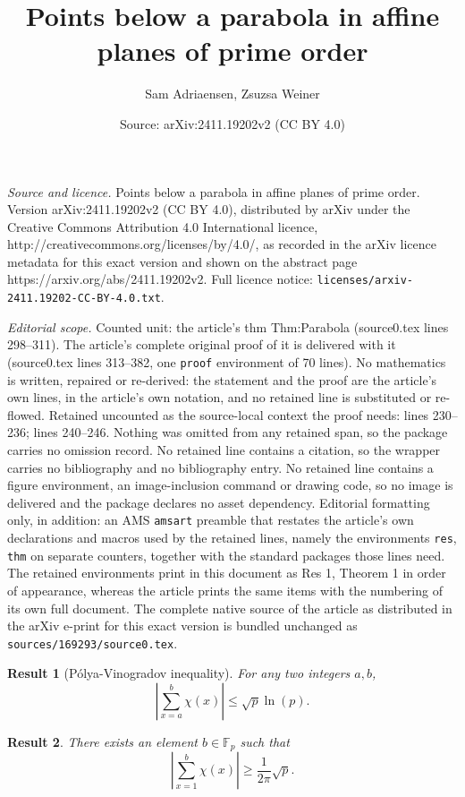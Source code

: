 \documentclass[10pt,a4paper]{amsart}
\title{Points below a parabola in affine planes of prime order}
\author{Sam Adriaensen, Zsuzsa Weiner}
\date{Source: arXiv:2411.19202v2 (CC BY 4.0)}
\newtheorem{res}{Result}
\newcommand{\FF}{\mathbb F}
\begin{document}
\maketitle

\noindent\emph{Source and licence.} Points below a parabola in affine planes of prime order. Version arXiv:2411.19202v2 (CC BY 4.0), distributed by arXiv under the Creative Commons Attribution 4.0 International licence, http://creativecommons.org/licenses/by/4.0/, as recorded in the arXiv licence metadata for this exact version and shown on the abstract page https://arxiv.org/abs/2411.19202v2. Full licence notice: \texttt{licenses/arxiv-2411.19202-CC-BY-4.0.txt}.\par\smallskip

\noindent\textit{Editorial scope.} Counted unit: the article's thm Thm:Parabola (source0.tex lines 298--311). The article's complete original proof of it is delivered with it (source0.tex lines 313--382, one \texttt{proof} environment of 70 lines). No mathematics is written, repaired or re-derived: the statement and the proof are the article's own lines, in the article's own notation, and no retained line is substituted or re-flowed.  Retained uncounted as the source-local context the proof needs: lines 230--236; lines 240--246.  Nothing was omitted from any retained span, so the package carries no omission record.  No retained line contains a citation, so the wrapper carries no bibliography and no bibliography entry.  No retained line contains a figure environment, an image-inclusion command or drawing code, so no image is delivered and the package declares no asset dependency.  Editorial formatting only, in addition: an AMS \texttt{amsart} preamble that restates the article's own declarations and macros used by the retained lines, namely the environments \texttt{res}, \texttt{thm} on separate counters, together with the standard packages those lines need.  The retained environments print in this document as Res 1, Theorem 1 in order of appearance, whereas the article prints the same items with the numbering of its own full document.  The complete native source of the article as distributed in the arXiv e-print for this exact version is bundled unchanged as \texttt{sources/169293/source0.tex}.
\begin{res}[P\'olya-Vinogradov inequality]
 \label{Res:PolyaVinogradov}
 For any two integers $a, b$,
 \[
  \left| \sum_{x=a}^b \chi(x) \right| \leq \sqrt p \ln(p).
 \]
\end{res}

\begin{res}
 \label{Res:Csikvari}
 There exists an element $b \in \FF_p$ such that
 \[
  \left| \sum_{x=1}^b \chi(x) \right| \geq \frac1{2\pi} \sqrt p.
 \]
\end{res}
\end{document}
